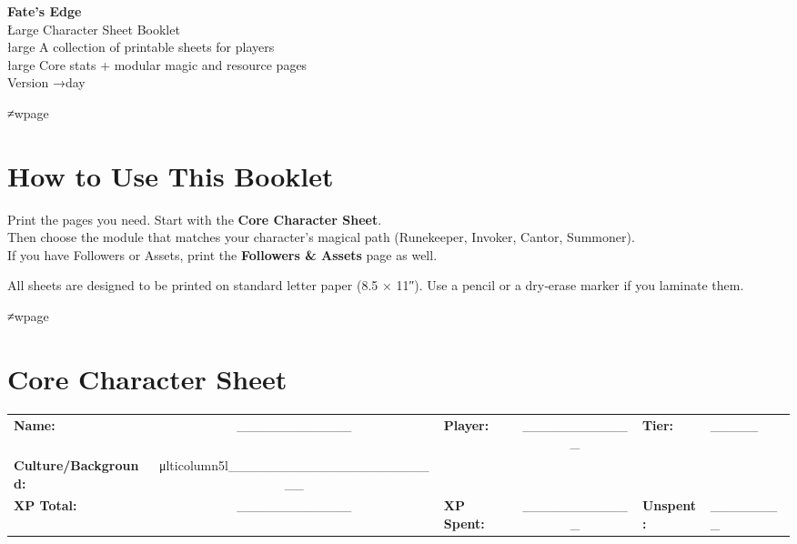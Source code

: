 \documentclass[11pt]{article}
\begin{document}
\begin{center}
  \vspace*{2cm}
  {\Huge \textbf{Fate's Edge}} \\[0.5cm]
  {Łarge Character Sheet Booklet} \\[2cm]
  \vfill
  {łarge A collection of printable sheets for players} \\
  {łarge Core stats + modular magic and resource pages} \\
  \vspace{1cm}
  {\small Version →day}
\end{center}
≠wpage

\section*{How to Use This Booklet}
Print the pages you need. Start with the \textbf{Core Character Sheet}.\\
Then choose the module that matches your character's magical path (Runekeeper, Invoker, Cantor, Summoner).\\
If you have Followers or Assets, print the \textbf{Followers & Assets} page as well.

\vspace{0.5cm}
\noindent All sheets are designed to be printed on standard letter paper (8.5 × 11″). Use a pencil or a dry‑erase marker if you laminate them.

≠wpage

\section*{Core Character Sheet}

\noindent
\begin{tabularx}{\textwidth}{X c X c X}
\textbf{Name:} & ____________ & 
\textbf{Player:} & ____________ & 
\textbf{Tier:} & _____ \\
\textbf{Culture/Background:} & μlticolumn{5}{l}{_______________________} \\
\textbf{XP Total:} & ____________ & 
\textbf{XP Spent:} & ____________ & 
\textbf{Unspent:} & ________ \\
\end{tabularx}

\vspace{0.5cm}
\end{document}
